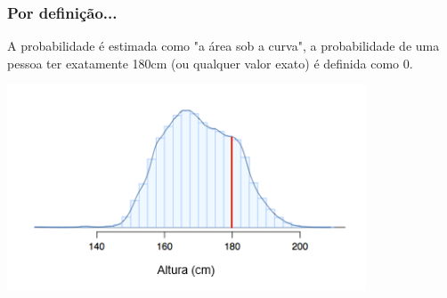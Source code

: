 
\begin{frame}
\frametitle{Por definição...}
\justifying
A probabilidade é estimada como "a área sob a curva", a probabilidade de uma pessoa ter exatamente 180cm (ou qualquer valor exato) é definida como 0.

\begin{center}
\includegraphics[width=0.8\textwidth]{2-5_continuous_distributions/fdicHeightContDist180.png}
\end{center}

\end{frame}

